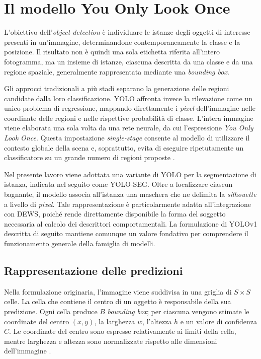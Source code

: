 \section{Il modello You Only Look Once}

L'obiettivo dell'\textit{object detection} è individuare le istanze degli oggetti di interesse presenti in un'immagine, determinandone contemporaneamente la classe e la posizione. Il risultato non è quindi una sola etichetta riferita all'intero fotogramma, ma un insieme di istanze, ciascuna descritta da una classe e da una regione spaziale, generalmente rappresentata mediante una \textit{bounding box}.

Gli approcci tradizionali a più stadi separano la generazione delle regioni candidate dalla loro classificazione. YOLO affronta invece la rilevazione come un unico problema di regressione, mappando direttamente i \textit{pixel} dell'immagine nelle coordinate delle regioni e nelle rispettive probabilità di classe. L'intera immagine viene elaborata una sola volta da una rete neurale, da cui l'espressione \textit{You Only Look Once}. Questa impostazione \textit{single-stage} consente al modello di utilizzare il contesto globale della scena e, soprattutto, evita di eseguire ripetutamente un classificatore su un grande numero di regioni proposte \cite{Redmon2016YOLO}.

Nel presente lavoro viene adottata una variante di YOLO per la segmentazione di istanza, indicata nel seguito come YOLO-SEG. Oltre a localizzare ciascun bagnante, il modello associa all'istanza una maschera che ne delimita la \textit{silhouette} a livello di \textit{pixel}. Tale rappresentazione è particolarmente adatta all'integrazione con DEWS, poiché rende direttamente disponibile la forma del soggetto necessaria al calcolo dei descrittori comportamentali. La formulazione di YOLOv1 descritta di seguito mantiene comunque un valore fondativo per comprendere il funzionamento generale della famiglia di modelli.

\subsection{Rappresentazione delle predizioni}

Nella formulazione originaria, l'immagine viene suddivisa in una griglia di $S\times S$ celle. La cella che contiene il centro di un oggetto è responsabile della sua predizione. Ogni cella produce $B$ \textit{bounding box}; per ciascuna vengono stimate le coordinate del centro $(x,y)$, la larghezza $w$, l'altezza $h$ e un valore di confidenza $C$. Le coordinate del centro sono espresse relativamente ai limiti della cella, mentre larghezza e altezza sono normalizzate rispetto alle dimensioni dell'immagine \cite{Redmon2016YOLO}.

